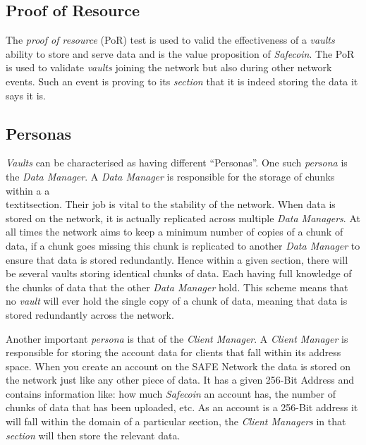 \subsection{Proof of Resource}
\label{subsec:proof-of-resource}

The \textit{proof of resource} (PoR) test is used to valid the effectiveness of a \textit{vaults} ability to store and serve data and is the value proposition of \textit{Safecoin}. The PoR is used to validate \textit{vaults} joining the network but also during other network events. Such an event is proving to its \textit{section} that it is indeed storing the data it says it is.

\subsection{Personas}

\textit{Vaults} can be characterised as having different ``Personas''. One such \textit{persona} is the \textit{Data Manager}. A \textit{Data Manager} is responsible for the storage of chunks within a a\\textit{section}. Their job is vital to the stability of the network. When data is stored on the network, it is actually replicated across multiple \textit{Data Managers}. At all times the network aims to keep a minimum number of copies of a chunk of data, if a chunk goes missing this chunk is replicated to another \textit{Data Manager} to ensure that data is stored redundantly. Hence within a given section, there will be several vaults storing identical chunks of data. Each having full knowledge of the chunks of data that the other \textit{Data Manager} hold. This scheme means that no \textit{vault} will ever hold the single copy of a chunk of data, meaning that data is stored redundantly across the network.

Another important \textit{persona} is that of the \textit{Client Manager}. A \textit{Client Manager} is responsible for storing the account data for clients that fall within its address space. When you create an account on the SAFE Network the data is stored on the network just like any other piece of data. It has a given 256-Bit Address and contains information like: how much \textit{Safecoin} an account has, the number of chunks of data that has been uploaded, etc. As an account is a 256-Bit address it will fall within the domain of a particular section, the \textit{Client Managers} in that \textit{section} will then store the relevant data.

